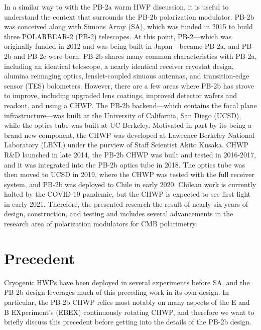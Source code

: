 In a similar way to with the PB-2a warm HWP discussion, it is useful to understand the context that surrounds the PB-2b polarization modulator. PB-2b was conceived along with Simons Array (SA), which was funded in 2015 to build three POLARBEAR-2 (PB-2) telescopes. At this point, PB-2---which was originally funded in 2012 and was being built in Japan---became PB-2a, and PB-2b and PB-2c were born. PB-2b shares many common characteristics with PB-2a, including an identical telescope, a nearly identical receiver cryostat design, alumina reimaging optics, lenslet-coupled sinuous antennas, and transition-edge sensor (TES) bolometers. However, there are a few areas where PB-2b has strove to improve, including upgraded lens coatings, improved detector wafers and readout, and using a CHWP. The PB-2b backend---which contains the focal plane infrastructure---was built at the University of California, San Diego (UCSD), while the optics tube was built at UC Berkeley. Motivated in part by its being a brand new component, the CHWP was developed at Lawrence Berkeley National Laboratory (LBNL) under the purview of Staff Scientist Akito Kusaka. CHWP R\&D launched in late 2014, the PB-2b CHWP was built and tested in 2016-2017, and it was integrated into the PB-2b optics tube in 2018. The optics tube was then moved to UCSD in 2019, where the CHWP was tested with the full receiver system, and PB-2b was deployed to Chile in early 2020. Chilean work is currently halted by the COVID-19 pandemic, but the CHWP is expected to see first light in early 2021. Therefore, the presented research the result of nearly six years of design, construction, and testing and includes several advancements in the research area of polarization modulators for CMB polarimetry.


\section{Precedent}
\label{sec:chwp_design_precedent}

Cryogenic HWPs have been deployed in several experiments before SA, and the PB-2b design leverages much of this preceding work in its own design. In particular, the PB-2b CHWP relies most notably on many aspects of the E and B EXperiment's (EBEX) continuously rotating CHWP, and therefore we want to briefly discuss this precedent before getting into the details of the PB-2b design.


